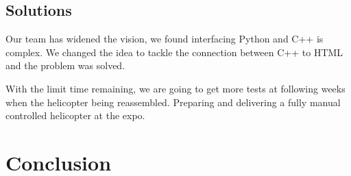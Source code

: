 \documentclass[onecolumn, draftclsnofoot,10pt, compsoc]{IEEEtran}
\begin{document}
\subsection{Solutions}

Our team has widened the vision, we found interfacing Python and C++ is complex. We changed the idea to tackle the connection between C++ to HTML and the problem was solved. 

With the limit time remaining, we are going to get more tests at following weeks when the helicopter being reassembled. Preparing and delivering a fully manual controlled helicopter at the expo.

\section{Conclusion}






\end{document}

